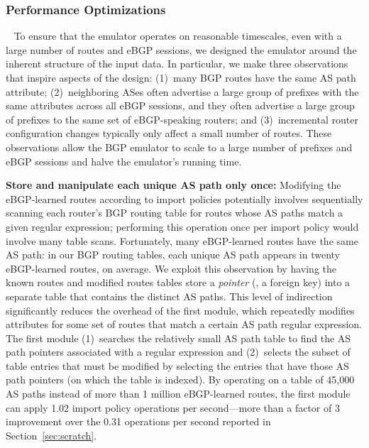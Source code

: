 \subsubsection{Performance Optimizations}~\label{sec:elim}
To ensure that the emulator operates on reasonable timescales, even
with a large number of routes and eBGP sessions, we designed the
emulator around the inherent structure of
the input data.
In particular, we make three observations that inspire aspects of the
design:
(1)~many BGP routes have the same AS path attribute; 
(2)~neighboring ASes often advertise a
  large group of prefixes with the 
  same attributes across all eBGP sessions, and they often advertise a
  large group of prefixes to the same set of eBGP-speaking routers; and
(3)~incremental router
  configuration changes typically only affect a small number 
  of routes.
These observations allow the BGP emulator to scale to a large
number of prefixes and eBGP sessions and halve the emulator's running
time.

\textbf{Store and manipulate each unique AS path only once:}
Modifying the eBGP-learned routes according to import policies
potentially involves sequentially scanning each router's BGP routing
table for routes whose AS paths match a given regular expression;
performing this operation once per import policy would involve many 
table scans.
Fortunately, many eBGP-learned routes have the same AS path: in our BGP
routing tables, each unique AS path appears in twenty eBGP-learned routes, on
average.  We exploit this observation by having the {\mfc known routes}
and {\dfc modified routes} tables store a {\em pointer\/} (\ie, a
foreign key) into a separate table that contains the distinct AS
paths.  This level of indirection significantly reduces the
overhead of the first module, which repeatedly modifies attributes for
some set of routes that match a certain AS path regular expression.
The first module (1)~searches the relatively small AS path table to
find the AS path pointers associated with a regular expression and
(2)~selects the subset of table entries that must be modified by
selecting the entries that have those AS path pointers (on which the
table is indexed).  By operating on a table of 45,000 AS paths
instead of more than 1 million eBGP-learned routes, the first module
can apply 1.02 import policy operations per second---more than a
factor of 3 improvement over the 0.31 operations per second reported
in Section~\ref{sec:scratch}.

